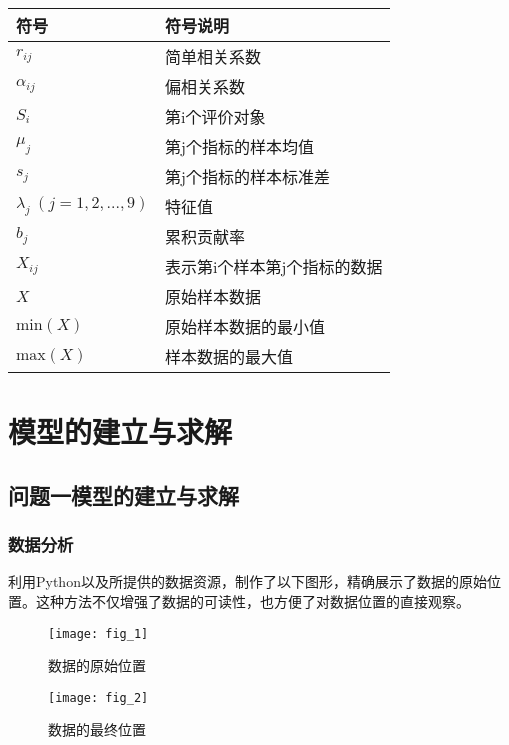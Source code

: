\documentclass[withoutpreface,bwprint,12pt,a4paper]{cumcmthesis}
\begin{document}
\begin{table}[H]
    \centering
    \begin{tabular}{ll}
        \toprule %
        符号 & 符号说明 \\
        \midrule %
        $r_{ij}$ & 简单相关系数 \\
        $\alpha_{ij}$ & 偏相关系数 \\
        $S_{i}$ & 第i个评价对象 \\
        $\mu_{j}$ & 第j个指标的样本均值 \\
        $s_{j}$ & 第j个指标的样本标准差 \\
        $\lambda_j \ (j=1,2,...,9)$ & 特征值 \\
        $b_j$ & 累积贡献率 \\
        $X_{ij}$ & 表示第i个样本第j个指标的数据 \\
        $X$ & 原始样本数据 \\
        $\text{min}(X)$ & 原始样本数据的最小值 \\
        $\text{max}(X)$ & 样本数据的最大值 \\
        \bottomrule %
    \end{tabular}
\end{table}


\section{模型的建立与求解}

\subsection{问题一模型的建立与求解}

\subsubsection{数据分析}
利用Python以及所提供的数据资源，制作了以下图形，精确展示了数据的原始位置。这种方法不仅增强了数据的可读性，也方便了对数据位置的直接观察。

\begin{figure}[H]
    \centering
    \begin{minipage}{0.48\textwidth}
        \centering
        \texttt{[image: fig\_1]}
        \caption{数据的原始位置}
    \end{minipage}\hfill
    \begin{minipage}{0.48\textwidth}
        \centering
        \texttt{[image: fig\_2]}
        \caption{数据的最终位置} %
    \end{minipage}
\end{figure}
\end{document}
